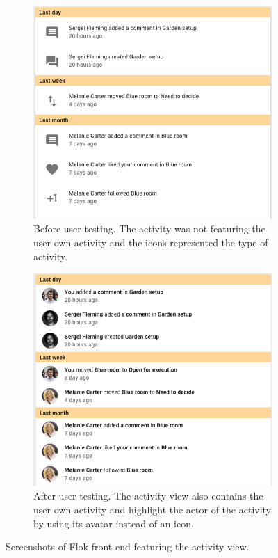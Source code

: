 \documentclass[a4paper,12pt, oneside]{article}
\begin{document}
\begin{figure}[!htb]
    \begin{subfigure}[t]{.495\textwidth}
        \includegraphics[width=\textwidth]{images/user_tests/activity_before.png}
        \caption{Before user testing. The activity was not featuring the user own activity and the icons represented the type of activity.}
        \label{fig.tests.activity.before}
    \end{subfigure}
    \hfill
    \begin{subfigure}[t]{.495\textwidth}
        \includegraphics[width=\textwidth]{images/user_tests/activity_after.png}
        \caption{After user testing. The activity view also contains the user own activity and highlight the actor of the activity by using its avatar instead of an icon.}
        \label{fig.tests.activity.after}
    \end{subfigure}
    \caption{Screenshots of Flok front-end featuring the activity view.}
    \label{fig.tests.activity}
\end{figure}
\end{document}

